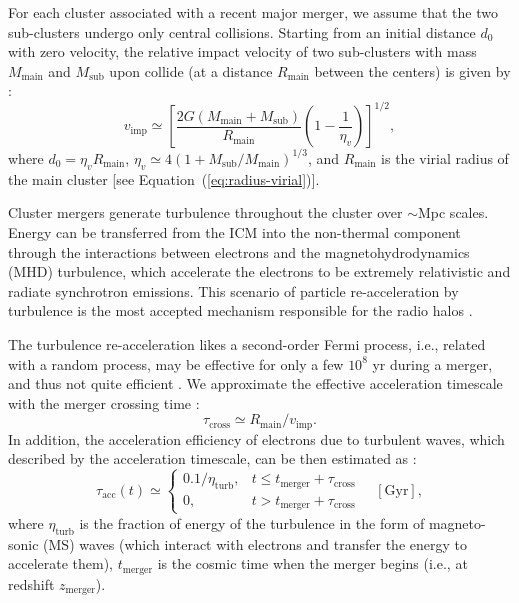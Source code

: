\documentclass[modern]{aastex61}
\begin{document}
For each cluster associated with a recent major merger, we assume that
the two sub-clusters undergo only central collisions.
Starting from an initial distance $d_0$ with zero velocity,
the relative impact velocity of two sub-clusters with mass
$M_{\mathrm{main}}$ and $M_{\mathrm{sub}}$ upon collide (at a distance
$R_{\mathrm{main}}$ between the centers) is given by
\citep{cassano2005,sarazin2002}:
\begin{equation}
  \label{eq:v-imp}
  v_{\mathrm{imp}} \simeq \left[
    \frac{2G (M_{\mathrm{main}} + M_{\mathrm{sub}})}{R_{\mathrm{main}}}
    \left( 1 - \frac{1}{\eta_v} \right)\right]^{1/2},
\end{equation}
where $d_0 = \eta_v R_{\mathrm{main}}$,
$\eta_v \simeq 4 (1 + M_{\mathrm{sub}}/M_{\mathrm{main}})^{1/3}$,
and $R_{\mathrm{main}}$ is the virial radius of the main cluster
[see Equation~(\ref{eq:radius-virial})].

Cluster mergers generate turbulence throughout the cluster over $\sim$Mpc
scales.  Energy can be transferred from the ICM into the non-thermal
component through the interactions between electrons and the
magnetohydrodynamics (MHD) turbulence, which accelerate the electrons
to be extremely relativistic and radiate synchrotron emissions.
This scenario of particle re-acceleration by turbulence is the most
accepted mechanism responsible for the radio halos \citep{feretti2012rev}.

The turbulence re-acceleration likes a second-order Fermi process, i.e.,
related with a random process, may be effective for only a few $10^8$ yr
during a merger, and thus not quite efficient
\citep{feretti2012rev,enblin2011}.
We approximate the effective acceleration timescale with the merger
crossing time \citep{cassano2005}:
\begin{equation}
  \label{eq:tau-cross}
  \tau_{\mathrm{cross}} \simeq R_{\mathrm{main}} / v_{\mathrm{imp}}.
\end{equation}
In addition, the acceleration efficiency of electrons due to turbulent waves,
which described by the acceleration timescale, can be then estimated as
\citep{cassano2005,brunetti2011}:
\begin{equation}
  \label{eq:tau-acc}
  \tau_{\mathrm{acc}}(t) \simeq \left\{
    \begin{array}{ll}
      0.1 / \eta_{\mathrm{turb}}, & t \leq t_{\mathrm{merger}} + \tau_{\mathrm{cross}} \\
      0, & t > t_{\mathrm{merger}} + \tau_{\mathrm{cross}}
    \end{array}
  \right. \quad [\mathrm{Gyr}],
\end{equation}
where $\eta_{\mathrm{turb}}$ is the fraction of energy of the turbulence
in the form of magneto-sonic (MS) waves (which interact with electrons
and transfer the energy to accelerate them),
$t_{\mathrm{merger}}$ is the cosmic time when the merger begins
(i.e., at redshift $z_{\mathrm{merger}}$).
\end{document}
